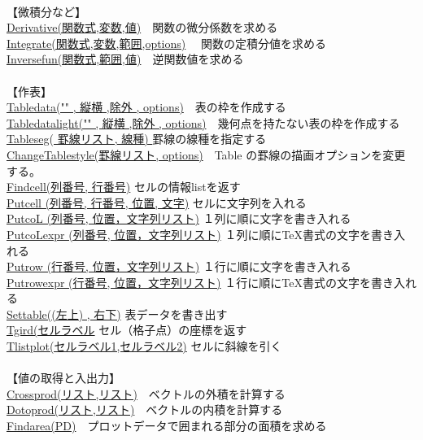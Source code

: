 \documentclass[papersize,a4paper,12pt,uplatex]{jsarticle}
\begin{document}
\begin{tabbing}
　\\
【微積分など】\\
\hyperlink{derivative}{Derivative(関数式,変数,値)}　\>関数の微分係数を求める\\
\hyperlink{integrate}{Integrate(関数式,変数,範囲,options)}　 \>関数の定積分値を求める\\
\hyperlink{inversefun}{Inversefun(関数式,範囲,値)}　\>逆関数値を求める\\
　\\
【作表】\\
\hyperlink{tabledata}{Tabledata("" , 縦横 ,除外 , options)}　\>表の枠を作成する\\
\hyperlink{tabledatalight}{Tabledatalight("" , 縦横 ,除外 , options)}　\>幾何点を持たない表の枠を作成する\\
\hyperlink{tableseg}{Tableseg( 罫線リスト, 線種) }  \>罫線の線種を指定する\\
\hyperlink{changetablestyle}{ChangeTablestyle(罫線リスト, options)}　\>Table の罫線の描画オプションを変更する。\\
\hyperlink{findcell}{Findcell(列番号, 行番号)}  \>セルの情報listを返す\\
\hyperlink{putcell}{Putcell (列番号, 行番号, 位置, 文字)}   \>セルに文字列を入れる\\
\hyperlink{putcol}{PutcoL (列番号, 位置，文字列リスト)}   \>１列に順に文字を書き入れる\\
\hyperlink{putcolexpr}{PutcoLexpr (列番号, 位置，文字列リスト)}  \>１列に順に\TeX 書式の文字を書き入れる\\
\hyperlink{putrow}{Putrow (行番号, 位置，文字列リスト)}   \>１行に順に文字を書き入れる\\
\hyperlink{putrowexpr}{Putrowexpr (行番号, 位置，文字列リスト)} \>１行に順に\TeX 書式の文字を書き入れる\\
\hyperlink{settable}{Settable((左上) , 右下)} \>表データを書き出す\\
\hyperlink{tgrid}{Tgird(セルラベル} \>セル（格子点）の座標を返す\\
\hyperlink{tlistplot}{Tlistplot(セルラベル1,セルラベル2)} \>セルに斜線を引く\\
　\\
【値の取得と入出力】\\
\hyperlink{crossprod}{Crossprod(リスト,リスト)}　\>ベクトルの外積を計算する\\
\hyperlink{dotprod}{Dotoprod(リスト,リスト)}　\>ベクトルの内積を計算する\\
\hyperlink{findarea}{Findarea(PD)}　\>プロットデータで囲まれる部分の面積を求める\\

\end{tabbing}
\end{document}
